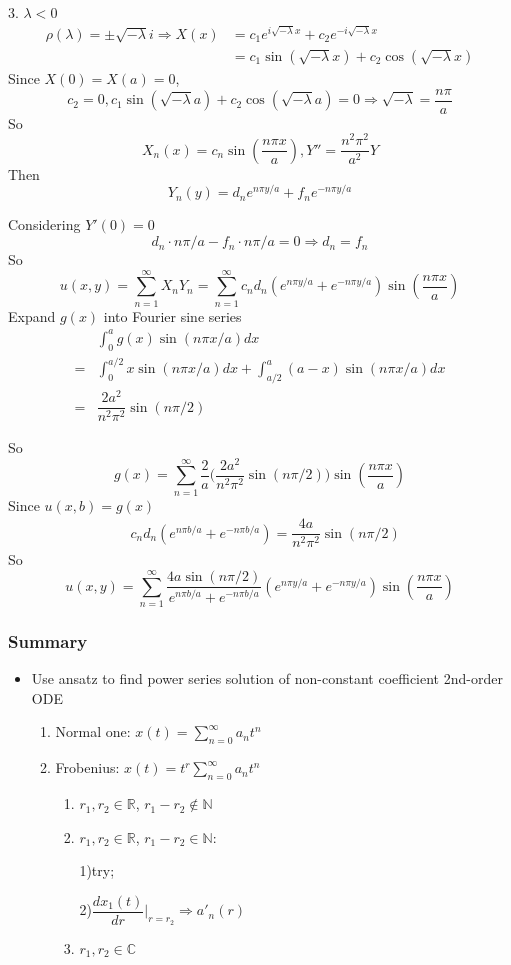 \documentclass{beamer}
\begin{document}
\begin{frame}
\begin{block}{3. $\lambda<0$}
\begin{align*}
\rho(\lambda)=\pm\sqrt{-\lambda}i\Rightarrow X(x)&=c_1e^{i\sqrt{-\lambda}x}+c_2e^{-i\sqrt{-\lambda}x}\\
&=c_1\sin(\sqrt{-\lambda}x)+c_2\cos(\sqrt{-\lambda}x)
\end{align*}
Since $X(0)=X(a)=0$, 
$$c_2=0,c_1\sin(\sqrt{-\lambda}a)+c_2\cos(\sqrt{-\lambda}a)=0\Rightarrow \sqrt{-\lambda}=\dfrac{n\pi}{a}$$
So 
$$X_n(x)=c_n\sin(\dfrac{n\pi x}{a}),Y''=\dfrac{n^2\pi^2}{a^2}Y$$
Then
$$Y_n(y)=d_ne^{n\pi y/a}+f_ne^{-n\pi y/a}$$
\end{block}
\end{frame}
\begin{frame}
Considering $Y'(0)=0$
$$d_n\cdot n\pi/a-f_n\cdot n\pi/a=0\Rightarrow d_n=f_n$$
So
$$u(x,y)=\sum\limits_{n=1}^{\infty}X_nY_n=\sum\limits_{n=1}^{\infty}c_nd_n(e^{n\pi y/a}+e^{-n\pi y/a})\sin(\dfrac{n\pi x}{a})$$
Expand $g(x)$ into Fourier sine series
\begin{align*}
&\int_0^ag(x)\sin (n\pi x/a)dx\\
=&\int_0^{a/2}x\sin(n\pi x/a)dx+\int_{a/2}^a(a-x)\sin(n\pi x/a)dx\\
=&\dfrac{2a^2}{n^2\pi^2}\sin(n\pi/2)
\end{align*}
\end{frame}
\begin{frame}
So 
$$g(x)=\sum\limits_{n=1}^{\infty}\dfrac{2}{a}\Bigg(\dfrac{2a^2}{n^2\pi^2}\sin(n\pi/2)\Bigg)\sin(\dfrac{n\pi x}{a})$$
Since $u(x,b)=g(x)$
\begin{align*}
&c_nd_n(e^{n\pi b/a}+e^{-n\pi b/a})=\dfrac{4a}{n^2\pi^2}\sin(n\pi/2)
\end{align*}
So $$u(x,y)=\sum\limits_{n=1}^{\infty}\dfrac{4a\sin(n\pi/2)}{e^{n\pi b/a}+e^{-n\pi b/a}}(e^{n\pi y/a}+e^{-n\pi y/a})\sin(\dfrac{n\pi x}{a})$$
\end{frame}

\begin{frame}
\frametitle{Summary}
\begin{itemize}
\item Use ansatz to find power series solution of non-constant coefficient 2nd-order ODE 
\begin{enumerate}
\item Normal one: $x(t)=\sum\limits_{n=0}^{\infty}a_nt^n$
\item Frobenius: $x(t)=t^r\sum\limits_{n=0}^{\infty}a_nt^n$
\begin{enumerate}
\item $r_1,r_2\in\mathbb{R}$, $r_1-r_2\notin\mathbb{N}$
\item $r_1,r_2\in\mathbb{R}$, $r_1-r_2\in\mathbb{N}$: 

1)try; 

2)$\dfrac{dx_1(t)}{dr}\Big|_{r=r_2}\Rightarrow a'_n(r)$

\item $r_1,r_2\in\mathbb{C}$
\end{enumerate}
\end{enumerate}
\end{itemize}
\end{frame}
\end{document}
